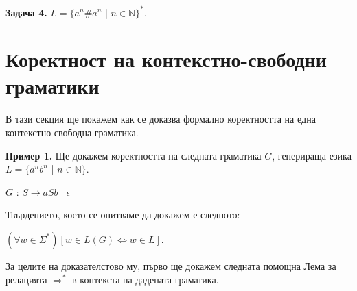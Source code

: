 \documentclass[openany]{book}
\begin{document}
    \textbf{Задача 4.} $L = \{a^n\#a^n$ | $n \in \mathbb{N}\}^*$.
\section{Коректност на контекстно-свободни граматики}

    \hspace{15pt} В тази секция ще покажем как се доказва формално коректността на
    една контекстно-свободна граматика. \\

    \vspace{15pt}

    \textbf{Пример 1.} Ще докажем коректността на следната граматика $G$, генерираща езика
    $L = \{a^nb^n$ | $n \in \mathbb{N}\}$. \\

    \begin{center}
    
       $G$ : $\boxed{S \rightarrow aSb \; | \; \epsilon}$
        
    \end{center}
    
    \vspace{5pt}

    \hspace{5pt} Твърдението, което се опитваме да докажем е следното: \\

    \begin{center}
        $(\forall w \in \Sigma^*)[w \in L(G) \iff w \in L]$.
    \end{center}

    За целите на доказателстово му, първо ще докажем следната помощна Лема за релацията
    $\Rightarrow^*$ в контекста на дадената граматика. \\

    \vspace{5pt}
\end{document}
